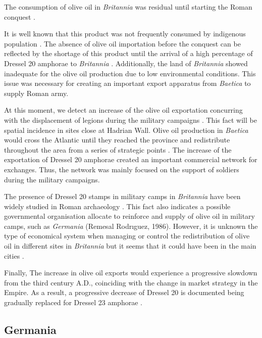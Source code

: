 \documentclass[review]{elsarticle}
\begin{document}
The consumption of olive oil in \textit{Britannia} was residual until starting the Roman conquest \citep{funari_corpus_1996,
carreras_abastecimiento_2003}.

It is well known that this product was not frequently consumed by indigenous population \citep[161]{monfort_britanniaen_1998}. The absence of olive oil importation before the conquest can be reflected by the shortage of this product until the arrival of a high percentage of Dressel 20 amphorae to \textit{Britannia} \citep[ 1]{carreras_britannia_1998}. Additionally, the land of \textit{Britannia} showed inadequate for the olive oil production due to low environmental conditions. This issue was necessary for creating an important export apparatus from \textit{Baetica} to supply Roman army.

At this moment, we detect an increase of the olive oil exportation concurring with the displacement of legions during the military campaigns \citep[161]{monfort_britanniaen_1998}. This fact will be spatial incidence in sites close at Hadrian Wall.  
Olive oil production in \textit{Baetica} would cross the Atlantic until they reached the province and redistribute throughout the area from a series of strategic points \citep{carreras_atlantic_2012}. The increase of the exportation of Dressel 20 amphorae created an important commercial network for exchanges. Thus, the network was mainly focused on the support of soldiers during the military campaigns. 


The presence of Dressel 20 stamps in military camps in \textit{Britannia} have been widely studied in Roman archaeology \citep{carreras_britannia_1998}. This fact also indicates a possible governmental organisation allocate to reinforce and supply of olive oil in military camps, such as \textit{Germania} (Remesal Rodrıguez, 1986). However, it is unknown the type of economical system when managing or control the redistribution of olive oil in different sites in \textit{Britannia} but it seems that it could have been in the main cities \citep[45]{funari_economic_2005}.

Finally, The increase in olive oil exports would experience a progressive slowdown from the third century A.D., coinciding with the change in market strategy in the Empire. As a result, a progressive decrease of Dressel 20 is documented being gradually replaced for Dressel 23 amphorae \citep{rodriguez1991aceite,millet_anforas_1998}.


\subsection{Germania}
\end{document}
